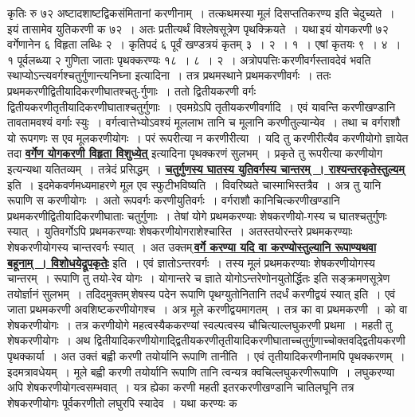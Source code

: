 \documentclass[11pt, openany]{book}
\begin{document}
{{\newpage
\noindent कृतिः रु ७२ अष्टादशाष्टद्विकसंमितानां करणीनाम्~। तत्कथमस्या मूलं
दिसप्ततिकरण्य 
इति चेदुच्यते~। इयं तासामेव युतिकरणी क ७२~। अतः प्रतीत्यर्थं
विश्लेषसूत्रेण 
पृथक्क्रियते~। यथा\textendash \,इयं योगकरणी ७२ वर्गेणानेन ६ विहृता लब्धिः २~। 
कृतिपदं ६ पूर्वं खण्डत्रयं कृतम् ३~। २~। १~। एषां कृतयः ९~। ४~। १
पूर्वलब्ध्या २ 
गुणिता जाताः पृथक्करण्यः १८~। ८~। २~। अत्रोपपत्तिः\textendash \,करणीवर्गस्तावदेवं
भवति {\qt स्थाप्योऽन्त्यवर्गश्चतुर्गुणान्त्यनिघ्ना} इत्यादिना~। तत्र
प्रथमस्थाने प्रथमकरणीवर्गः~। ततः प्रथमकरणीद्वितीयादिकरणीघातश्चतु-र्गुणाः~। ततो द्वितीयकरणी वर्गः द्वितीयकरणीतृतीयादिकरणीघाताश्चतुर्गुणाः~।
एवमग्रेऽपि तृतीयकरणीवर्गादि~। एवं यावन्ति करणीखण्डानि तावतामवश्यं
वर्गाः स्युः~। वर्गत्वात्तेभ्योऽवश्यं मूललाभ तानि च मूलानि करणीतुल्यान्येव~। 
तथा च वर्गराशौ यो रूपगणः स एव मूलकरणीयोगः~। परं रूपरीत्या न करणीरीत्या~। 
यदि तु करणीरीत्यैव करणीयोगो ज्ञायेत तदा \hyperref[39]{\textbf{वर्गेण योगकरणी विहृता विशुध्येत्}} इत्यादिना पृथक्करणं सुलभम्~। प्रकृते तु रूपरीत्या करणीयोग इत्यन्यथा
यतितव्यम्~। तत्रेदं प्रसिद्धम्~। \hyperref[131]{\textbf{चतुर्गुणस्य घातस्य युतिवर्गस्य चान्तरम्~। राश्यन्तरकृतेस्तुल्यम्}} इति~। इदमेकवर्णमध्यमाहरणे मूल एव स्फुटीभविष्यति~। विवरिष्यते चास्माभिस्तत्रैव~। अत्र तु यानि रूपाणि स करणीयोगः~। अतो रूपवर्गः
करणीयुतिवर्गः~। वर्गराशौ कानिचित्करणीखण्डानि
प्रथमकरणीद्वितीयादिकरणीघाताः चतुर्गुणाः~। तेषां 
योगे प्रथमकरण्याः शेषकरणीयो-गस्य च घातश्चतुर्गुणः स्यात्~। युतिवर्गोऽपि
प्रथमकरण्याः शेषकरणीयोगराशेश्चास्ति~। अतस्तयोरन्तरे प्रथमकरण्याः शेषकरणीयोगस्य चान्तरवर्गः
स्यात्~। अत उक्तम्\textendash \,\hyperref[41]{\textbf{वर्गे करण्या यदि वा करण्योस्तुल्यानि रूपाण्यथवा बहूनाम्~। विशोधयेद्रूपकृतेः}} इति~। एवं ज्ञातोऽन्तरवर्गः~। तस्य मूलं
प्रथमकरण्याः शेषकरणीयोगस्य चान्तरम्~। रूपाणि तु तयो-रेव योगः~। योगान्तरे
च ज्ञाते {\qt योगोऽन्तरेणोनयुतोर्द्धितः} इति सङ्क्रमणसूत्रेण तयोर्ज्ञानं सुलभम्~। तदिदमुक्तम्\textendash \,{\qt शेषस्य पदेन रूपाणि पृथग्युतोनितानि तदर्धं करणीद्वयं स्यात्} इति~। एवं जाता
प्रथमकरणी अवशिष्टकरणीयोगश्च~। अत्र मूले करणीद्वयमागतम्~। तत्र का वा
प्रथमकरणी~। को वा शेषकरणीयोगः~। तत्र करणीयोगे महत्वस्यैककरण्यां
स्वल्पत्वस्य चौचित्याल्लघुकरणी प्रथमा~। महती तु शेषकरणीयोगः~। अथ
द्वितीयादिकरणीयोगाद्द्वितीयकरणीतृतीयादिकरणीघाताच्चतुर्गुणाच्चोक्तवद्द्वितीयकरणी
पृथक्कार्या~। अत उक्तं बह्वी करणी तयोर्यानि रूपाणि तानीति~। एवं
तृतीयादिकरणीनामपि पृथक्करणम्~। इदमत्रावधेयम्~। मूले बह्वी 
करणी तयोर्यानि रूपाणि तानि त्वन्यत्र क्वचिल्लघुकरणीरूपाणि~।
लघुकरण्या
\newpage
\noindent अपि शेषकरणीयोगत्वसम्भवात्~। यत्र ह्येका करणी महती इतरकरणीखण्डानि 
चातिलघूनि तत्र शेषकरणीयोगः पूर्वकरणीतो लघुरपि स्यादेव~। यथा करण्यः क 
}}
\end{document}
